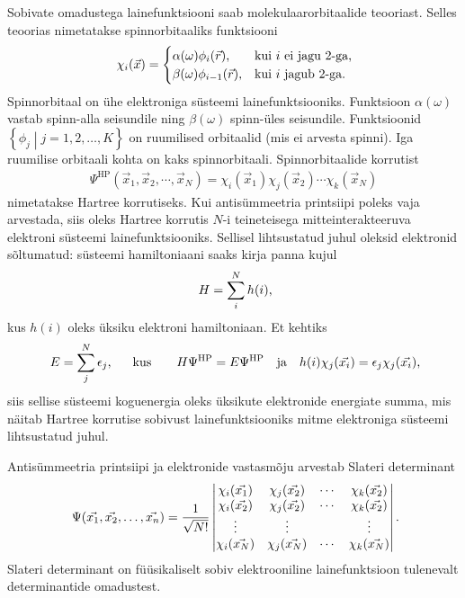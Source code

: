 \documentclass[12pt]{report}
\def\cparen#1{\left\{#1\right\}}
\begin{document}
Sobivate omadustega lainefunktsiooni saab molekulaarorbitaalide teooriast.
Selles teoorias nimetatakse spinnorbitaaliks funktsiooni
\begin{align}\label{eq:spinorb}
    \chi_i(\vec{x}) = \begin{cases}
        \alpha(\omega) \phi_i(\vec{r})\text{,} & \text{kui \(i\) ei jagu \(2\)-ga} \rlap{,}\\
        \beta(\omega) \phi_{i-1}(\vec{r})\text{,} & \text{kui \(i\) jagub \(2\)-ga} \rlap{.} \\
    \end{cases}
\end{align}
Spinnorbitaal on ühe elektroniga süsteemi lainefunktsiooniks.
Funktsioon \(\alpha(\omega)\) vastab spinn-alla seisundile ning \(\beta(\omega)\) spinn-üles seisundile.
Funktsioonid \(\cparen{\phi_j \middle| j = 1,2, \ldots, K}\) on ruumilised orbitaalid (mis ei arvesta spinni).
Iga ruumilise orbitaali kohta on kaks spinn\-orbitaali.
Spinnorbitaalide korrutist
\begin{align}
    \Psi^\text{HP}(\vec{x}_1, \vec{x}_2, \cdots, \vec{x}_N) =
    \chi_i(\vec{x}_1) \chi_j(\vec{x}_2) \cdots \chi_k(\vec{x}_N)
\end{align}
nimetatakse Hartree korrutiseks.
Kui antisümmeetria printsiipi poleks vaja arvestada, siis oleks Hartree korrutis \(N\)-i teineteisega mitteinterakteeruva elektroni süsteemi lainefunktsiooniks.
Sellisel lihtsustatud juhul oleksid elektronid sõltumatud: süsteemi hamiltoniaani saaks kirja panna kujul
\begin{align}
    H = \sum_i^N h(i) \rlap{,}
\end{align}
kus \(h(i)\) oleks üksiku elektroni hamiltoniaan.
Et kehtiks
\begin{align}
    E = \sum_j^N \epsilon_j \rlap{,}
    \qquad \text{kus} \qquad
    H \Psi^\text{HP} = E \Psi^\text{HP}
    \quad \text{ja} \quad
    h(i) \chi_j(\vec{x_i}) = \epsilon_j \chi_j(\vec{x_i}) \rlap{,}
\end{align}
siis sellise süsteemi koguenergia oleks üksikute elektronide energiate summa, mis näitab Hartree korrutise sobivust lainefunktsiooniks mitme elektroniga süsteemi lihtsustatud juhul.

Antisümmeetria printsiipi ja elektronide vastasmõju arvestab Slateri determinant
\begin{align}\label{eq:slater}
    \Psi(\vec{x_1}, \vec{x_2}, \ldots, \vec{x_n}) =
    \frac{1}{\sqrt{N!}} \begin{vmatrix}
        \chi_i(\vec{x_1}) & \chi_j(\vec{x_2}) & \cdots & \chi_k(\vec{x_2}) \\
        \chi_i(\vec{x_2}) & \chi_j(\vec{x_2}) & \cdots & \chi_k(\vec{x_2}) \\
        \vdots & \vdots & & \vdots \\
        \chi_i(\vec{x_N}) & \chi_j(\vec{x_N}) & \cdots & \chi_k(\vec{x_N}) \\
    \end{vmatrix} \rlap{.}
\end{align}
Slateri determinant on füüsikaliselt sobiv elektrooniline lainefunktsioon tulenevalt determinantide omadustest.
\end{document}
